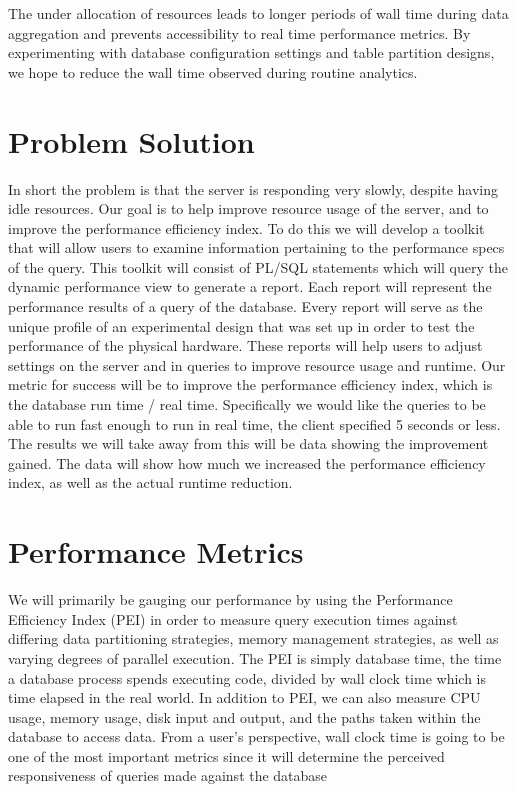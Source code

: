 \documentclass[draftclsnofoot, onecolumn, 10pt]{IEEEtran}
\begin{document}
The under allocation of resources leads to longer periods of wall time during
data aggregation and prevents accessibility to real time performance metrics. By
experimenting with database configuration settings and table partition designs, we
hope to reduce the wall time observed during routine analytics.



\section*{Problem Solution}
In short the problem is that the server is responding very slowly, despite having
idle resources. Our goal is to help improve resource usage of the server, and to 
improve the performance efficiency index. To do this we will develop a toolkit that
will allow users to examine information pertaining to the performance specs of the
query. This toolkit will consist of PL/SQL statements which will query the dynamic
performance view to generate a report. Each report will represent the performance
results of a query of the database. Every report will serve as the unique profile
of an experimental design that was set up in order to test the performance of the
physical hardware. These reports will help users to adjust settings on the server
and in queries to improve resource usage and runtime. Our metric for success will
be to improve the performance efficiency index, which is the database run time / real time.
Specifically we would like the queries to be able to run fast enough to run in real
time, the client specified 5 seconds or less. The results we will take away from this
will be data showing the improvement gained. The data will show how much we increased
the performance efficiency index, as well as the actual runtime reduction.  

\section*{Performance Metrics}
We will primarily be gauging our performance by using the Performance Efficiency Index
(PEI) in order to measure query execution times against differing data partitioning
strategies, memory management strategies, as well as varying degrees of parallel execution.
The PEI is simply database time, the time a database process spends executing code, divided
by wall clock time which is time elapsed in the real world. In addition to PEI, we can
also measure CPU usage, memory usage, disk input and output, and the paths taken within
the database to access data. From a user’s perspective, wall clock time is going to be
one of the most important metrics since it will determine the perceived responsiveness
of queries made against the database
\end{document}
